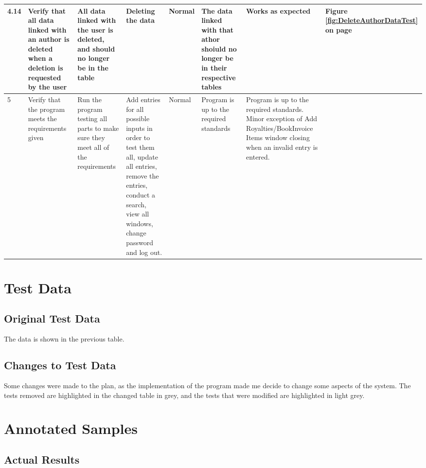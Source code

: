 \begin{landscape}
\begin{center}
\begin{longtable}{|p{1.5cm}|p{2cm}|p{2.5cm}|p{2.5cm}|p{2cm}|p{2cm}|p{2cm}|p{2cm}|}
\rowcolor{lightgray} 4.14 & Verify that all data linked with an author is deleted when a deletion is requested by the user & All data linked with the user is deleted, and should no longer be in the table & Deleting the data & Normal & The data linked with that athor shoiuld no longer be in their respective tables & Works as expected & Figure \ref{fig:DeleteAuthorDataTest} on page \pageref{fig:DeleteAuthorDataTest} \\ \hline 
        5 & Verify that the program meets the requirements given & Run the program testing all parts to make sure they meet all of the requirements & Add entries for all possible inputs in order to test them all, update all entries, remove the entries, conduct a search, view all windows, change password and log out. & Normal & Program is up to the required standards & Program is up to the required standards. Minor exception of Add Royalties/BookInvoice Items window closing when an invalid entry is entered. & \\ \hline
    \end{longtable}
\end{center}

\section{Test Data}

\subsection{Original Test Data}

The data is shown in the previous table.

\subsection{Changes to Test Data}

Some changes were made to the plan, as the implementation of the program made me decide to change some aspects of the system. The tests removed are highlighted in the changed table in grey, and the tests that were modified are highlighted in light grey.

\section{Annotated Samples}

\subsection{Actual Results}


\end{landscape}
